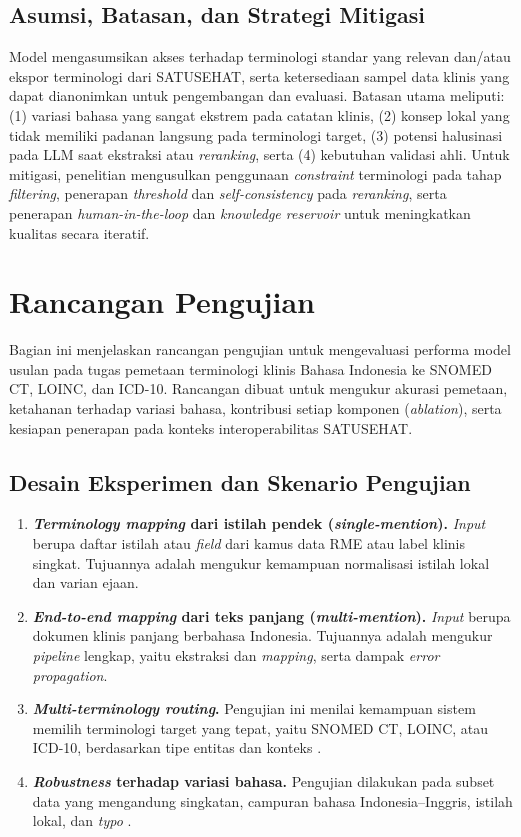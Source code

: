 \subsection{Asumsi, Batasan, dan Strategi Mitigasi}

Model mengasumsikan akses terhadap terminologi standar yang relevan dan/atau ekspor terminologi dari SATUSEHAT, serta ketersediaan sampel data klinis yang dapat dianonimkan untuk pengembangan dan evaluasi. Batasan utama meliputi: (1) variasi bahasa yang sangat ekstrem pada catatan klinis, (2) konsep lokal yang tidak memiliki padanan langsung pada terminologi target, (3) potensi halusinasi pada LLM saat ekstraksi atau \textit{reranking}, serta (4) kebutuhan validasi ahli. Untuk mitigasi, penelitian mengusulkan penggunaan \textit{constraint} terminologi pada tahap \textit{filtering}, penerapan \textit{threshold} dan \textit{self-consistency} pada \textit{reranking}, serta penerapan \textit{human-in-the-loop} dan \textit{knowledge reservoir} untuk meningkatkan kualitas secara iteratif.

\section{Rancangan Pengujian}

Bagian ini menjelaskan rancangan pengujian untuk mengevaluasi performa model usulan pada tugas pemetaan terminologi klinis Bahasa Indonesia ke SNOMED CT, LOINC, dan ICD-10. Rancangan dibuat untuk mengukur akurasi pemetaan, ketahanan terhadap variasi bahasa, kontribusi setiap komponen (\textit{ablation}), serta kesiapan penerapan pada konteks interoperabilitas SATUSEHAT.

\subsection{Desain Eksperimen dan Skenario Pengujian}

\begin{enumerate}
    \item \textbf{\textit{Terminology mapping} dari istilah pendek (\textit{single-mention}).} \textit{Input} berupa daftar istilah atau \textit{field} dari kamus data RME atau label klinis singkat. Tujuannya adalah mengukur kemampuan normalisasi istilah lokal dan varian ejaan.
    \item \textbf{\textit{End-to-end mapping} dari teks panjang (\textit{multi-mention}).} \textit{Input} berupa dokumen klinis panjang berbahasa Indonesia. Tujuannya adalah mengukur \textit{pipeline} lengkap, yaitu ekstraksi dan \textit{mapping}, serta dampak \textit{error propagation}.
    \item \textbf{\textit{Multi-terminology routing}.} Pengujian ini menilai kemampuan sistem memilih terminologi target yang tepat, yaitu SNOMED CT, LOINC, atau ICD-10, berdasarkan tipe entitas dan konteks \citep{ayuningtyas_bringing_2025}.
    \item \textbf{\textit{Robustness} terhadap variasi bahasa.} Pengujian dilakukan pada subset data yang mengandung singkatan, campuran bahasa Indonesia--Inggris, istilah lokal, dan \textit{typo} \citep{purwitasari_comparison_2023}.
\end{enumerate}

